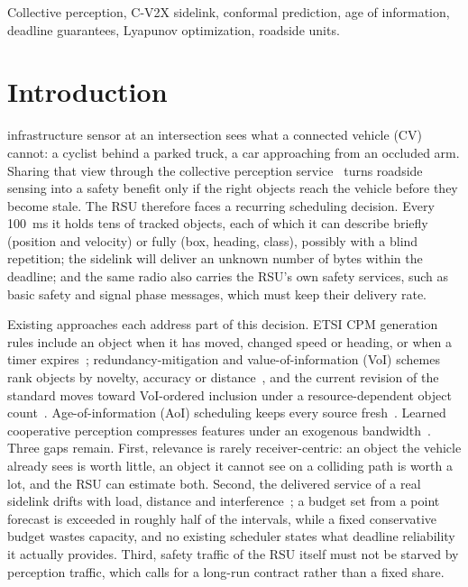 \documentclass[journal]{IEEEtran}
\theoremstyle{remark}
\begin{document}
\begin{IEEEkeywords}
Collective perception, C-V2X sidelink, conformal prediction, age of information, deadline guarantees, Lyapunov optimization, roadside units.
\end{IEEEkeywords}

\section{Introduction}
 infrastructure sensor at an intersection sees what a connected vehicle (CV) cannot: a cyclist behind a parked truck, a car approaching from an occluded arm. Sharing that view through the collective perception service~\cite{etsi103324,saej3224} turns roadside sensing into a safety benefit only if the right objects reach the vehicle before they become stale. The RSU therefore faces a recurring scheduling decision. Every 100~ms it holds tens of tracked objects, each of which it can describe briefly (position and velocity) or fully (box, heading, class), possibly with a blind repetition; the sidelink will deliver an unknown number of bytes within the deadline; and the same radio also carries the RSU's own safety services, such as basic safety and signal phase messages, which must keep their delivery rate.

Existing approaches each address part of this decision. ETSI CPM generation rules include an object when it has moved, changed speed or heading, or when a timer expires~\cite{etsi103562,thandavarayan2020generation}; redundancy-mitigation and value-of-information (VoI) schemes rank objects by novelty, accuracy or distance~\cite{thandavarayan2020redundancy,delooz2019,lyu2025voi,lyu2025survey,higuchi2019value}, and the current revision of the standard moves toward VoI-ordered inclusion under a resource-dependent object count~\cite{lyu2025survey}. Age-of-information (AoI) scheduling keeps every source fresh~\cite{kaul2012,kadota2018,yates2021aoi}. Learned cooperative perception compresses features under an exogenous bandwidth~\cite{where2comm,how2comm,codefilling,who2com,when2com}. Three gaps remain. First, relevance is rarely receiver-centric: an object the vehicle already sees is worth little, an object it cannot see on a colliding path is worth a lot, and the RSU can estimate both. Second, the delivered service of a real sidelink drifts with load, distance and interference~\cite{seev2x,gonzalez2019analytical}; a budget set from a point forecast is exceeded in roughly half of the intervals, while a fixed conservative budget wastes capacity, and no existing scheduler states what deadline reliability it actually provides. Third, safety traffic of the RSU itself must not be starved by perception traffic, which calls for a long-run contract rather than a fixed share.
\end{document}
